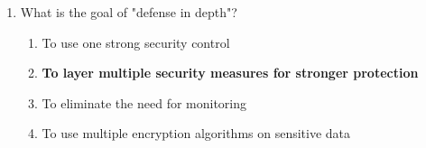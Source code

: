 \begin{enumerate}
    \item What is the goal of "defense in depth"?
    \begin{enumerate}
        \item To use one strong security control
        \item \textbf{To layer multiple security measures for stronger
              protection}
        \item To eliminate the need for monitoring
        \item To use multiple encryption algorithms on sensitive data
    \end{enumerate}
\end{enumerate}

\newpage

